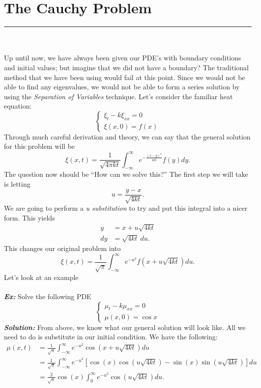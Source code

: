 \section{The Cauchy Problem}
\hrule
\noindent \\\\
\indent Up until now, we have always been given our PDE's with boundary conditions and initial values; but imagine that we did not have a boundary? The traditional method that we have been using would fail at this point. Since we would not be able to find any eigenvalues, we would not be able to form a series solution by using the \textit{Separation of Variables} technique. Let's consider the familiar heat equation:
\[
\begin{cases}
\xi_{t} - k\xi_{xx} = 0\\
\xi(x,0) = f(x)
\end{cases}
\]
Through much careful derivation and theory, we can say that the general solution for this problem will be
\[
\xi(x,t) = \frac{1}{\sqrt{4 \pi k t}}\int_{-\infty}^{\infty}e^{-\frac{(x-y)^{2}}{4kt}}f(y)dy.
\]
The question now should be ``How can we solve this?'' The first step we will take is letting
\[
u = \frac{y-x}{\sqrt{4kt}}.
\]
We are going to perform a \textit{u substitution} to try and put this integral into a nicer form. This yields
\begin{align*}
y &= x + u\sqrt{4kt}\\
dy &= \sqrt{4kt}\ du.
\end{align*}
This changes our original problem into
\[
\xi(x,t) = \frac{1}{\sqrt{\pi}}\int_{-\infty}^{\infty}e^{-u^{2}}f(x+u\sqrt{4kt})du.
\]
Let's look at an example\\\\
\noindent \textbf{\textit{Ex:}} Solve the following PDE
\[
\begin{cases}
\mu_{t} - k\mu_{xx} = 0\\
\mu(x,0) = \cos{x}
\end{cases}
\]
\indent \textbf{\textit{Solution:}} From above, we know what our general solution will look like. All we need to do is substitute in our initial condition. We have the following:
\begin{align*}
\mu(x,t) &= \frac{1}{\sqrt{\pi}}\int_{-\infty}^{\infty}e^{-u^{2}}\cos{(x + u\sqrt{4kt})}du\\
&= \frac{1}{\sqrt{\pi}}\int_{-\infty}^{\infty}e^{-u^{2}}\left[\cos{(x)}\cos{(u\sqrt{4kt})} - \sin{(x)}\sin{(u\sqrt{4kt})}\right]du\\
&=  \frac{2}{\sqrt{\pi}}\cos{(x)}\int_{0}^{\infty}e^{-u^{2}}\cos{(u\sqrt{4kt})}du.
\end{align*}
